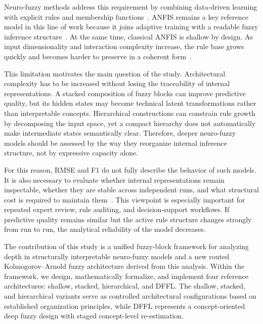 \documentclass[runningheads]{llncs}
\begin{document}
Neuro-fuzzy methods address this requirement by combining data-driven learning with explicit rules and membership functions~\cite{jang1993anfis,mitra2000neurofuzzy}. ANFIS remains a key reference model in this line of work because it joins adaptive training with a readable fuzzy inference structure~\cite{jang1993anfis}. At the same time, classical ANFIS is shallow by design. As input dimensionality and interaction complexity increase, the rule base grows quickly and becomes harder to preserve in a coherent form~\cite{mitra2000neurofuzzy,magdalena2019semantic}.

This limitation motivates the main question of the study. Architectural complexity has to be increased without losing the traceability of internal representations. A stacked composition of fuzzy blocks can improve predictive quality, but its hidden states may become technical latent transformations rather than interpretable concepts. Hierarchical constructions can constrain rule growth by decomposing the input space, yet a compact hierarchy does not automatically make intermediate states semantically clear. Therefore, deeper neuro-fuzzy models should be assessed by the way they reorganize internal inference structure, not by expressive capacity alone.

For this reason, RMSE and F1 do not fully describe the behavior of such models. It is also necessary to evaluate whether internal representations remain inspectable, whether they are stable across independent runs, and what structural cost is required to maintain them~\cite{rudin2019stop,zeng2019deep,feng2020highly,alvarez2018self,koh2020concept,chen2019looks,chen2020concept}. This viewpoint is especially important for repeated expert review, rule auditing, and decision-support workflows. If predictive quality remains similar but the active rule structure changes strongly from run to run, the analytical reliability of the model decreases.

The contribution of this study is a unified fuzzy-block framework for analyzing depth in structurally interpretable neuro-fuzzy models and a new routed Kolmogorov--Arnold fuzzy architecture derived from this analysis. Within the framework, we design, mathematically formalize, and implement four reference architectures: shallow, stacked, hierarchical, and DFFL. The shallow, stacked, and hierarchical variants serve as controlled architectural configurations based on established organization principles, while DFFL represents a concept-oriented deep fuzzy design with staged concept-level re-estimation.
\end{document}
